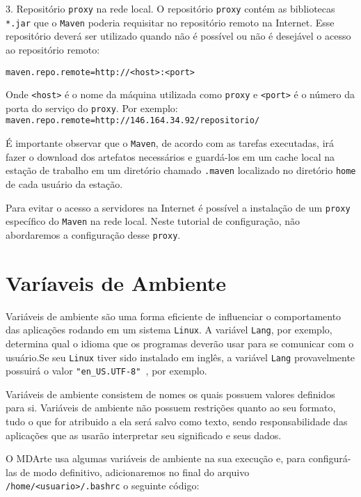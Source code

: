 3. Repositório \texttt{proxy} na rede local. O repositório \texttt{proxy} contém
as bibliotecas \texttt{*.jar} que o \texttt{Maven} poderia requisitar no
repositório remoto na Internet. Esse repositório deverá ser utilizado quando não
é possível ou não é desejável o acesso ao repositório remoto:

\begin{verbatim}
maven.repo.remote=http://<host>:<port> 
\end{verbatim}

Onde \texttt{<host>} é o nome da máquina utilizada como \texttt{proxy} e
\texttt{<port>} é o número da porta do serviço do \texttt{proxy}. Por exemplo:
\texttt{maven.repo.remote=http://146.164.34.92/repositorio/}

É importante observar que o \texttt{Maven}, de acordo com as tarefas executadas,
irá fazer o download dos artefatos necessários e guardá-los em um cache local na
estação de trabalho em um diretório chamado \texttt{.maven} localizado no
diretório \texttt{home} de cada usuário da estação.

Para evitar o acesso a servidores na Internet é possível a instalação de um
\texttt{proxy} específico do \texttt{Maven} na rede local. Neste tutorial de
configuração, não abordaremos a configuração desse \texttt{proxy}.

\section{Varíaveis de Ambiente}

Variáveis de ambiente são uma forma eficiente de influenciar o comportamento das
aplicações rodando em um sistema \texttt{Linux}. A variável \texttt{Lang}, por
exemplo, determina qual o idioma que os programas deverão usar para se comunicar
com o usuário.Se seu \texttt{Linux} tiver sido instalado em inglês, a variável \texttt{Lang}
provavelmente possuirá o valor \texttt{"en\_US.UTF-8" }, por exemplo.

Variáveis de ambiente consistem de nomes os quais possuem valores definidos para
si. Variáveis de ambiente não possuem restrições quanto ao seu formato, tudo o
que for atribuido a ela será salvo como texto, sendo responsabilidade das
aplicações que as usarão interpretar seu significado e seus dados. 

O MDArte usa algumas variáveis de ambiente na sua execução e, para configurá-las
de modo definitivo, adicionaremos no final do arquivo
\texttt{/home/<usuario>/.bashrc} o seguinte código:

